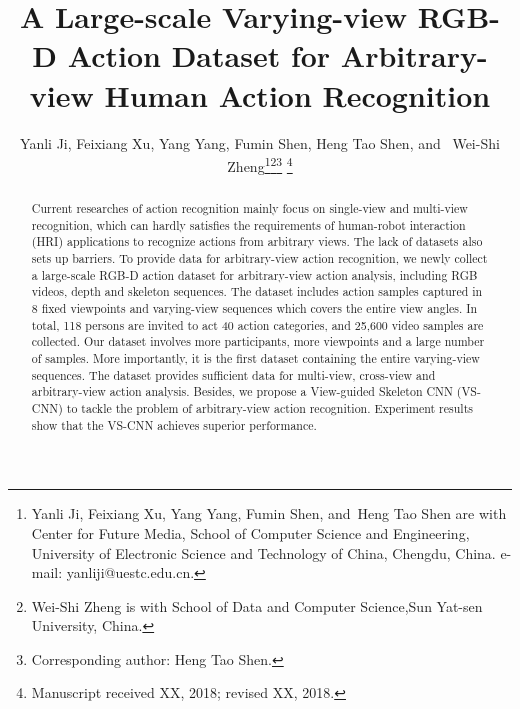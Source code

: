 \documentclass[journal]{IEEEtran}
\begin{document}
\title{A Large-scale Varying-view RGB-D Action Dataset for Arbitrary-view Human Action Recognition}

\author{Yanli Ji, Feixiang Xu, Yang Yang, Fumin Shen, Heng Tao Shen,
        and~ Wei-Shi Zheng\thanks{Yanli Ji, Feixiang Xu, Yang Yang, Fumin Shen, and~Heng Tao Shen are with Center for Future Media, School of Computer Science and Engineering, University of Electronic Science and Technology of China, Chengdu, China. e-mail: yanliji@uestc.edu.cn.}\thanks{Wei-Shi Zheng is with School of Data and Computer Science,Sun Yat-sen University, China.}\thanks{Corresponding author: Heng Tao Shen.}
\thanks{Manuscript received XX, 2018; revised XX, 2018.}}















\maketitle

\begin{abstract}
Current researches of action recognition mainly focus on single-view and multi-view recognition, which can hardly satisfies the requirements of human-robot interaction (HRI) applications to recognize actions from arbitrary views. The lack of datasets also sets up barriers. To provide data for arbitrary-view action recognition, we newly collect a large-scale RGB-D action dataset for arbitrary-view action analysis, including RGB videos, depth and skeleton sequences. The dataset includes action samples captured in 8 fixed viewpoints and varying-view sequences which covers the entire  view angles. In total, 118 persons are invited to act 40 action categories, and 25,600 video samples are collected. Our dataset involves more participants, more viewpoints and a large number of samples. More importantly, it is the first dataset containing the entire  varying-view sequences. The dataset provides sufficient data for multi-view, cross-view and arbitrary-view action analysis. Besides, we propose a View-guided Skeleton CNN (VS-CNN) to tackle the problem of arbitrary-view action recognition. Experiment results show that the VS-CNN achieves superior performance.
\end{abstract}
\end{document}
